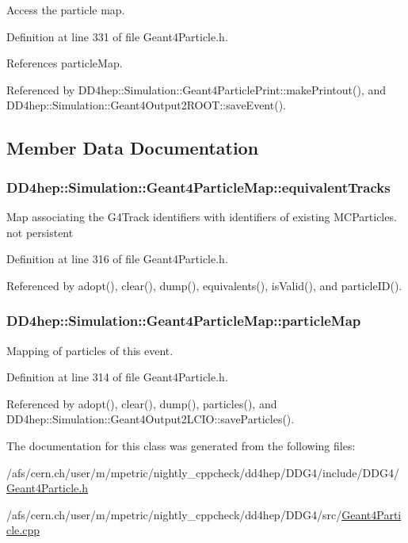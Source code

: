 Access the particle map. 

Definition at line 331 of file Geant4Particle.h.

References particleMap.

Referenced by DD4hep::Simulation::Geant4ParticlePrint::makePrintout(), and DD4hep::Simulation::Geant4Output2ROOT::saveEvent().

\subsection{Member Data Documentation}
\hypertarget{class_d_d4hep_1_1_simulation_1_1_geant4_particle_map_a61cdcde928de729988141a9cf643e9ad}{
\subsubsection[{equivalentTracks}]{ {\bf DD4hep::Simulation::Geant4ParticleMap::equivalentTracks}}}
\label{class_d_d4hep_1_1_simulation_1_1_geant4_particle_map_a61cdcde928de729988141a9cf643e9ad}


Map associating the G4Track identifiers with identifiers of existing MCParticles. not persistent 

Definition at line 316 of file Geant4Particle.h.

Referenced by adopt(), clear(), dump(), equivalents(), isValid(), and particleID().\hypertarget{class_d_d4hep_1_1_simulation_1_1_geant4_particle_map_ac5be2ea78909ee55da8e4008c4f727a0}{
\subsubsection[{particleMap}]{ {\bf DD4hep::Simulation::Geant4ParticleMap::particleMap}}}
\label{class_d_d4hep_1_1_simulation_1_1_geant4_particle_map_ac5be2ea78909ee55da8e4008c4f727a0}


Mapping of particles of this event. 

Definition at line 314 of file Geant4Particle.h.

Referenced by adopt(), clear(), dump(), particles(), and DD4hep::Simulation::Geant4Output2LCIO::saveParticles().

The documentation for this class was generated from the following files:\begin{DoxyCompactItemize}
\item 
/afs/cern.ch/user/m/mpetric/nightly\_\-cppcheck/dd4hep/DDG4/include/DDG4/\hyperlink{_geant4_particle_8h}{Geant4Particle.h}\item 
/afs/cern.ch/user/m/mpetric/nightly\_\-cppcheck/dd4hep/DDG4/src/\hyperlink{_geant4_particle_8cpp}{Geant4Particle.cpp}\end{DoxyCompactItemize}
